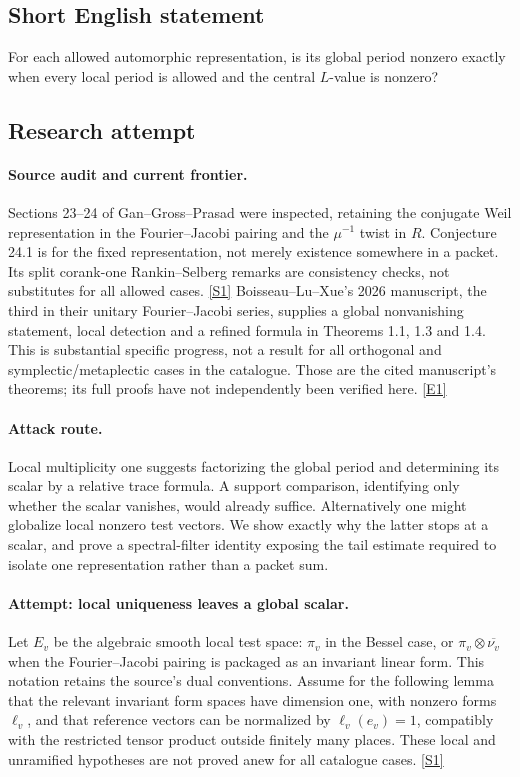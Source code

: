 \documentclass[11pt,a4paper]{article}
\newcommand{\sref}[2]{\hyperlink{source:#1:#2}{[S#2]}}
\newcommand{\eref}[2]{\hyperlink{extra:#1:#2}{[E#2]}}
\numberwithin{equation}{section}
\begin{document}
\subsection{Short English statement}
For each allowed automorphic representation, is its global period nonzero exactly when every local period is allowed and the central $L$-value is nonzero?
\subsection{Research attempt}

\paragraph{Source audit and current frontier.}
Sections 23--24 of Gan--Gross--Prasad were inspected, retaining the conjugate
Weil representation in the Fourier--Jacobi pairing and the $\mu^{-1}$ twist
in $R$. Conjecture 24.1 is for the fixed representation, not merely existence
somewhere in a packet. Its split corank-one Rankin--Selberg remarks are
consistency checks, not substitutes for all allowed cases. \sref{30006977}{1}
Boisseau--Lu--Xue's 2026 manuscript, the third in their unitary
Fourier--Jacobi series, supplies a global nonvanishing statement, local
detection and a refined formula in Theorems 1.1, 1.3 and 1.4. This is substantial
specific progress, not a result for all orthogonal and symplectic/metaplectic
cases in the catalogue. Those are the cited manuscript's theorems; its full
proofs have not independently been verified here. \eref{30006977}{1}

\paragraph{Attack route.}
Local multiplicity one suggests factorizing the global period and determining
its scalar by a relative trace formula. A support comparison, identifying
only whether the scalar vanishes, would already suffice. Alternatively one
might globalize local nonzero test vectors. We show exactly why the latter
stops at a scalar, and prove a spectral-filter identity exposing the tail
estimate required to isolate one representation rather than a packet sum.

\paragraph{Attempt: local uniqueness leaves a global scalar.}
Let $E_v$ be the algebraic smooth local test space: $\pi_v$ in the Bessel
case, or $\pi_v\otimes\overline{\nu_v}$ when the Fourier--Jacobi pairing
is packaged as an invariant linear form. This notation retains the source's
dual conventions. Assume for the following lemma that the relevant invariant
form spaces have dimension one, with nonzero forms $\ell_v$, and that
reference vectors can be normalized by $\ell_v(e_v)=1$, compatibly with the
restricted tensor product outside finitely many places. These local and
unramified hypotheses are not proved anew for all catalogue cases.
\sref{30006977}{1}
\end{document}
